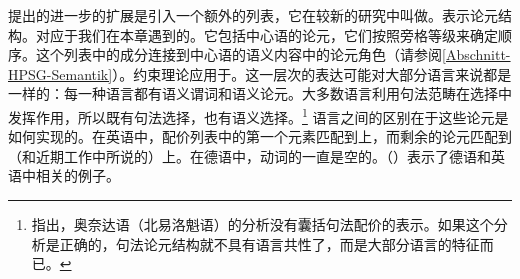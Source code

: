  提出的进一步的扩展是引入一个额外的列表，它在较新的研究中叫做\argst{}。\argstc 表示论元结构。\argstlc 对应于我们在本章遇到的\subcatlc。它包括中心语的论元，它们按照旁格等级来确定顺序。这个列表中的成分连接到中心语的语义内容中的论元角色（请参阅\ref{Abschnitt-HPSG-Semantik}）。约束理论应用于\argstlc。这一层次的表达可能对大部分语言来说都是一样的：每一种语言都有语义谓词和语义论元。大多数语言利用句法范畴在选择中发挥作用，所以既有句法选择，也有语义选择。\footnote{%
 \citet{KM2012a}指出，奥奈达语（北易洛魁语）的分析没有囊括句法配价的表示。如果这个分析是正确的，句法论元结构就不具有语言共性了，而是大部分语言的特征而已。
}
语言之间的区别在于这些论元是如何实现的。在英语中，配价列表中的第一个元素匹配到\sprlc 上，而剩余的论元匹配到\subcatc （和近期工作中所说的\compslc）上。在德语中，动词的\sprlc 一直是空的。（）表示了德语和英语中相关的例子。

